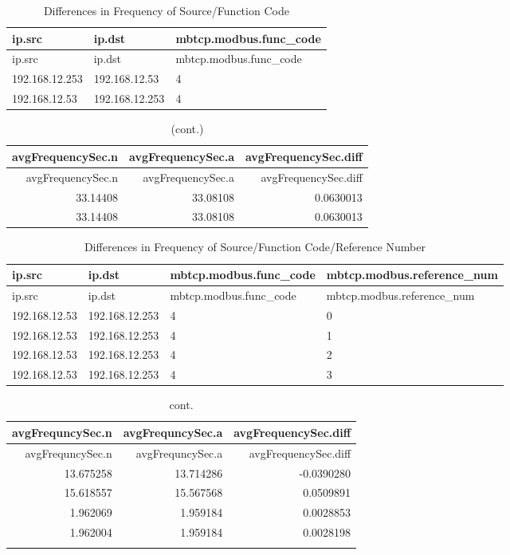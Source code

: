 \documentclass[12pt,]{article}
\begin{document}
\begin{longtable}[c]{@{}lll@{}}
\caption{Differences in Frequency of Source/Function
Code}\tabularnewline
\toprule
ip.src & ip.dst & mbtcp.modbus.func\_code\tabularnewline
\midrule
\endfirsthead
\toprule
ip.src & ip.dst & mbtcp.modbus.func\_code\tabularnewline
\midrule
\endhead
192.168.12.253 & 192.168.12.53 & 4\tabularnewline
192.168.12.53 & 192.168.12.253 & 4\tabularnewline
\bottomrule
\end{longtable}

\begin{longtable}[c]{@{}rrr@{}}
\caption{(cont.)}\tabularnewline
\toprule
avgFrequencySec.n & avgFrequencySec.a &
avgFrequencySec.diff\tabularnewline
\midrule
\endfirsthead
\toprule
avgFrequencySec.n & avgFrequencySec.a &
avgFrequencySec.diff\tabularnewline
\midrule
\endhead
33.14408 & 33.08108 & 0.0630013\tabularnewline
33.14408 & 33.08108 & 0.0630013\tabularnewline
\bottomrule
\end{longtable}

\begin{longtable}[c]{@{}llll@{}}
\caption{Differences in Frequency of Source/Function Code/Reference
Number}\tabularnewline
\toprule
ip.src & ip.dst & mbtcp.modbus.func\_code &
mbtcp.modbus.reference\_num\tabularnewline
\midrule
\endfirsthead
\toprule
ip.src & ip.dst & mbtcp.modbus.func\_code &
mbtcp.modbus.reference\_num\tabularnewline
\midrule
\endhead
192.168.12.53 & 192.168.12.253 & 4 & 0\tabularnewline
192.168.12.53 & 192.168.12.253 & 4 & 1\tabularnewline
192.168.12.53 & 192.168.12.253 & 4 & 2\tabularnewline
192.168.12.53 & 192.168.12.253 & 4 & 3\tabularnewline
\bottomrule
\end{longtable}

\begin{longtable}[c]{@{}rrr@{}}
\caption{cont.}\tabularnewline
\toprule
avgFrequncySec.n & avgFrequncySec.a &
avgFrequencySec.diff\tabularnewline
\midrule
\endfirsthead
\toprule
avgFrequncySec.n & avgFrequncySec.a &
avgFrequencySec.diff\tabularnewline
\midrule
\endhead
13.675258 & 13.714286 & -0.0390280\tabularnewline
15.618557 & 15.567568 & 0.0509891\tabularnewline
1.962069 & 1.959184 & 0.0028853\tabularnewline
1.962004 & 1.959184 & 0.0028198\tabularnewline
\newpage & &\tabularnewline
\bottomrule
\end{longtable}
\end{document}
